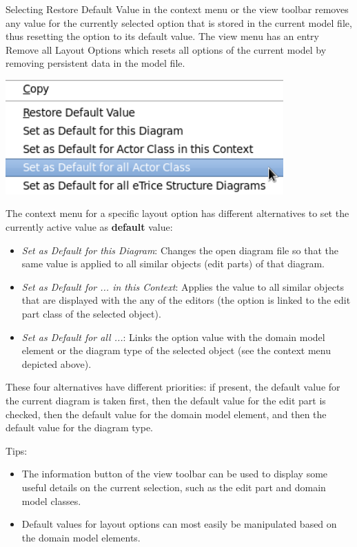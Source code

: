 Selecting Restore Default Value in the context menu or the view toolbar removes any value for the 
currently selected option that is stored in the current model file, thus resetting the option to its 
default value. The view menu has an entry Remove all Layout Options which resets all options of the 
current model by removing persistent data in the model file.

\includegraphics[width=0.8\textwidth]{images/043-ContextMenu.png}

The context menu for a specific layout option has different alternatives to set the currently active value 
as \textbf{default} value:
\begin{itemize}
\item \textit{Set as Default for this Diagram}: Changes the open diagram file so that the same value is 
applied to all similar objects (edit parts) of that diagram.

\item \textit{Set as Default for ... in this Context}: Applies the value to all similar objects that are 
displayed with the any of the \eTrice{} editors (the option is linked to the edit part class of the selected 
object).

\item \textit{Set as Default for all ...}: Links the option value with the domain model element or the 
diagram type of the selected object (see the context menu depicted above).
\end{itemize}

These four alternatives have different priorities: if present, the default value for the current diagram 
is taken first, then the default value for the edit part is checked, then the default value for the domain 
model element, and then the default value for the diagram type.

Tips:
\begin{itemize}
\item The information button of the view toolbar can be used to display some useful details on the current 
selection, such as the edit part and domain model classes.
\item Default values for layout options can most easily be manipulated based on the \eTrice{} domain model 
elements.
\end{itemize}

